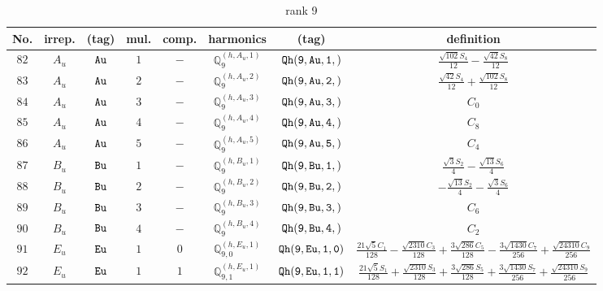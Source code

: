 \documentclass[fleqn,8pt]{jsarticle}
\begin{document}
\begin{table}[ht!]
\begin{center}
\caption{rank 9}
\renewcommand{\arraystretch}{1.3}
\begin{tabular}{cccccccc} \hline \hline
No. & irrep. & (tag) & mul. & comp. & harmonics & (tag) & definition \\ \hline
$ 82 $ & $ A_{u} $ & $ {\tt Au} $ & $ 1 $ & $ - $ & $ \mathbb{Q}_{9}^{(h,A_{u},1)} $ & $ {\tt Qh(9,Au,1,)} $ & $ \frac{\sqrt{102} S_{4}}{12} - \frac{\sqrt{42} S_{8}}{12} $ \\
$ 83 $ & $ A_{u} $ & $ {\tt Au} $ & $ 2 $ & $ - $ & $ \mathbb{Q}_{9}^{(h,A_{u},2)} $ & $ {\tt Qh(9,Au,2,)} $ & $ \frac{\sqrt{42} S_{4}}{12} + \frac{\sqrt{102} S_{8}}{12} $ \\
$ 84 $ & $ A_{u} $ & $ {\tt Au} $ & $ 3 $ & $ - $ & $ \mathbb{Q}_{9}^{(h,A_{u},3)} $ & $ {\tt Qh(9,Au,3,)} $ & $ C_{0} $ \\
$ 85 $ & $ A_{u} $ & $ {\tt Au} $ & $ 4 $ & $ - $ & $ \mathbb{Q}_{9}^{(h,A_{u},4)} $ & $ {\tt Qh(9,Au,4,)} $ & $ C_{8} $ \\
$ 86 $ & $ A_{u} $ & $ {\tt Au} $ & $ 5 $ & $ - $ & $ \mathbb{Q}_{9}^{(h,A_{u},5)} $ & $ {\tt Qh(9,Au,5,)} $ & $ C_{4} $ \\
$ 87 $ & $ B_{u} $ & $ {\tt Bu} $ & $ 1 $ & $ - $ & $ \mathbb{Q}_{9}^{(h,B_{u},1)} $ & $ {\tt Qh(9,Bu,1,)} $ & $ \frac{\sqrt{3} S_{2}}{4} - \frac{\sqrt{13} S_{6}}{4} $ \\
$ 88 $ & $ B_{u} $ & $ {\tt Bu} $ & $ 2 $ & $ - $ & $ \mathbb{Q}_{9}^{(h,B_{u},2)} $ & $ {\tt Qh(9,Bu,2,)} $ & $ - \frac{\sqrt{13} S_{2}}{4} - \frac{\sqrt{3} S_{6}}{4} $ \\
$ 89 $ & $ B_{u} $ & $ {\tt Bu} $ & $ 3 $ & $ - $ & $ \mathbb{Q}_{9}^{(h,B_{u},3)} $ & $ {\tt Qh(9,Bu,3,)} $ & $ C_{6} $ \\
$ 90 $ & $ B_{u} $ & $ {\tt Bu} $ & $ 4 $ & $ - $ & $ \mathbb{Q}_{9}^{(h,B_{u},4)} $ & $ {\tt Qh(9,Bu,4,)} $ & $ C_{2} $ \\
$ 91 $ & $ E_{u} $ & $ {\tt Eu} $ & $ 1 $ & $ 0 $ & $ \mathbb{Q}_{9,0}^{(h,E_{u},1)} $ & $ {\tt Qh(9,Eu,1,0)} $ & $ \frac{21 \sqrt{5} C_{1}}{128} - \frac{\sqrt{2310} C_{3}}{128} + \frac{3 \sqrt{286} C_{5}}{128} - \frac{3 \sqrt{1430} C_{7}}{256} + \frac{\sqrt{24310} C_{9}}{256} $ \\
$ 92 $ & $ E_{u} $ & $ {\tt Eu} $ & $ 1 $ & $ 1 $ & $ \mathbb{Q}_{9,1}^{(h,E_{u},1)} $ & $ {\tt Qh(9,Eu,1,1)} $ & $ \frac{21 \sqrt{5} S_{1}}{128} + \frac{\sqrt{2310} S_{3}}{128} + \frac{3 \sqrt{286} S_{5}}{128} + \frac{3 \sqrt{1430} S_{7}}{256} + \frac{\sqrt{24310} S_{9}}{256} $ \\

\end{tabular}
\end{center}
\end{table}
\end{document}
